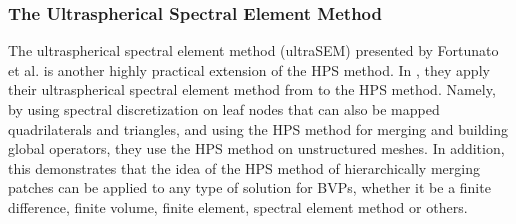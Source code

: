 \subsubsection{The Ultraspherical Spectral Element Method}

The ultraspherical spectral element method (ultraSEM) presented by Fortunato et al. is another highly practical extension of the HPS method. In \cite{fortunato2020ultraspherical}, they apply their ultraspherical spectral element method from \cite{olver2013fast} to the HPS method. Namely, by using spectral discretization on leaf nodes that can also be mapped quadrilaterals and triangles, and using the HPS method for merging and building global operators, they use the HPS method on unstructured meshes. In addition, this demonstrates that the idea of the HPS method of hierarchically merging patches can be applied to any type of solution for BVPs, whether it be a finite difference, finite volume, finite element, spectral element method or others.
